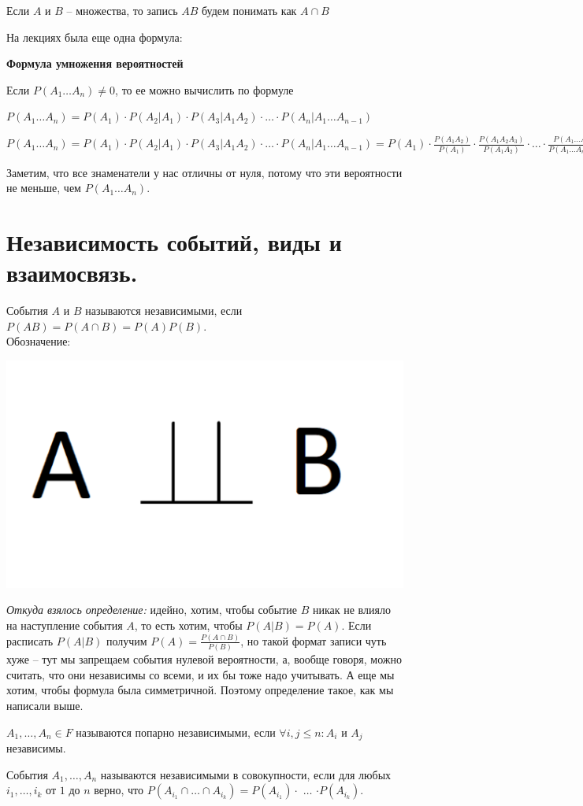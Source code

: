 \Note Если $A$ и $B$ -- множества, то запись $AB$ будем понимать как $A \cap B$

На лекциях была еще одна формула:

\textbf{Формула умножения вероятностей}

Если $P(A_1\dots A_n) \neq 0$, то ее можно вычислить по формуле

$P(A_1\dots A_n) = P(A_1) \cdot P(A_2|A_1) \cdot P(A_3|A_1A_2) \cdot \dots \cdot P(A_n|A_1\dots A_{n - 1})$

\Proof
$P(A_1\dots A_n) = P(A_1) \cdot P(A_2|A_1) \cdot P(A_3|A_1A_2) \cdot \dots \cdot P(A_n|A_1\dots A_{n - 1}) = P(A_1) \cdot \frac{P(A_1A_2)}{P(A_1)} \cdot \frac{P(A_1A_2A_3)}{P(A_1A_2)} \cdot \dots \cdot \frac{P(A_1\dots A_n)}{P(A_1\dots A_{n - 1})}$

Заметим, что все знаменатели у нас отличны от нуля, потому что эти вероятности не меньше, чем $P(A_1\dots A_n)$.

\EndProof


\section{Независимость событий, виды и взаимосвязь.}

\Def События $A$ и $B$ называются независимыми, если $P(AB) = P(A \cap B) = P(A)P(B)$.\\Обозначение:

\includegraphics[width=0.1\linewidth]{images/5_1.png}

\textit{Откуда взялось определение:} идейно, хотим, чтобы событие $B$ никак не влияло на наступление события $A$, то есть хотим, чтобы $P(A|B) = P(A)$. Если расписать $P(A|B)$ получим $P(A) = \frac{P(A\cap B)}{P(B)}$, но такой формат записи чуть хуже -- тут мы запрещаем события нулевой вероятности, а, вообще говоря, можно считать, что они независимы со всеми, и их бы тоже надо учитывать. А еще мы хотим, чтобы формула была симметричной. Поэтому определение такое, как мы написали выше.

\Def $A_1, \dots, A_n \in F$ называются попарно независимыми, если $\forall i, j \leq n : A_i$ и $A_j$ независимы.

\Def События $A_1, \dots, A_n$ называются независимыми в совокупности, если для любых $i_1, \dots, i_k$ от $1$ до $n$ верно, что
$P(A_{i_1} \cap \dots \cap A_{i_k}) = P(A_{i_1}) \cdot$  $\dots$
$\cdot P(A_{i_k})$.

